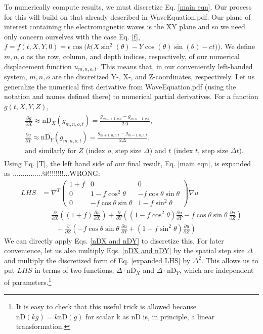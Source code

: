 \documentclass{article}
\begin{document}
To numerically compute results, we must discretize Eq. \ref{main eqn}. Our process for this will build on that already described in WaveEquation.pdf. Our plane of interest containing the electromagnetic waves is the XY plane and so we need only concern ourselves with the case Eq. \ref{f}, $f=f(t,X,Y,0)=\epsilon \cos\big(k\big(X \sin ^2(\theta )-Y\cos (\theta ) \sin (\theta )-ct\big)\big).$ We define $m,n,o$ as the row, column, and depth indices, respectively, of our numerical displacement function $u_{m,n,o,t}$. This means that, in our conveniently left-handed system, $m,n,o$ are the discretized Y-, X-, and Z-coordinates, respectively. Let us generalize the numerical first derivative from WaveEquation.pdf (using the notation and names defined there) to numerical partial derivatives. For a function $g(t,X,Y,Z)$,
\begin{align} \label{nDX and nDY}
\begin{split}
&\frac{\partial g}{\partial X} \approx \mbox{nD}_X(g_{m,n,o,t})=\frac{g_{m,n+1,o,t}-g_{m,n-1,o,t}}{2\Delta}, \\ 
&\frac{\partial g}{\partial Y} \approx \mbox{nD}_Y(g_{m,n,o,t})=\frac{g_{m+1,n,o,t}-g_{m-1,n,o,t}}{2\Delta}, \\
&\text{and similarly for $Z$ (index $o$, step size $\Delta$) and $t$ (index $t$, step size $\Delta t$).}
\end{split}
\end{align}
Using Eq. \ref{T}, the left hand side of our final result, Eq. \ref{main eqn}, is expanded as ...............@!!!!!!!!...WRONG:
\begin{align} \label{expanded LHS}
LHS &=
\nabla^T \begin{pmatrix}
1+f & 0 & 0 \\
0 & 1-f\cos^2\theta & -f\cos\theta\sin\theta \\
0 & -f\cos\theta\sin\theta & 1-f\sin^2\theta
\end{pmatrix} \nabla u \nonumber \\
&=
\frac{\partial}{\partial X}\left((1+f)\frac{\partial u}{\partial X}\right)+\frac{\partial}{\partial Y}\left((1-f\cos^2\theta)\frac{\partial u}{\partial Y}-f\cos\theta\sin\theta\ \frac{\partial u}{\partial Z} \right)\\ 
&\qquad+\frac{\partial}{\partial Z}\left(-f\cos\theta\sin\theta\ \frac{\partial u}{\partial Y} + (1-f\sin^2\theta)\frac{\partial u}{\partial Z}\right) \nonumber
\end{align}
We can directly apply Eqs. \ref{nDX and nDY} to discretize this. For later convenience, let us also multiply Eqs. \ref{nDX and nDY} by the spatial step size $\Delta$ and multiply the discretized form of Eq. \ref{expanded LHS} by $\Delta^2$. This allows us to put $LHS$ in terms of two functions, $\Delta\cdot\mbox{nD}_X$ and $\Delta\cdot\mbox{nD}_Y$, which are independent of parameters.\footnote{It is easy to check that this useful trick is allowed because $\mbox{nD}(kg)=k\mbox{nD}(g)$ for scalar k as $\mbox{nD}$ is, in principle, a linear transformation.}
\end{document}
